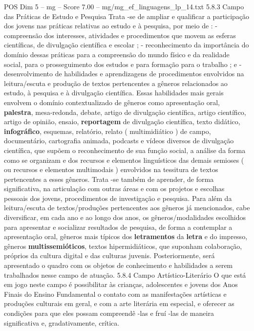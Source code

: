 \begin{textsample}{POS Dim 5 – mg – Score 7.00 – mg/mg\_ef\_linguagens\_lp\_14.txt}  \label{ex:f5_pos_188}
5.8.3 Campo das Práticas de Estudo e Pesquisa Trata -se de ampliar e qualificar a participação dos jovens nas práticas relativas ao estudo e à pesquisa, por meio de : - compreensão dos interesses, atividades e procedimentos que movem as esferas científicas, de divulgação científica e escolar ; - reconhecimento da importância do domínio dessas práticas para a compreensão do mundo físico e da realidade social, para o prosseguimento dos estudos e para formação para o trabalho ; e - desenvolvimento de habilidades e aprendizagens de procedimentos envolvidos na leitura/escuta e produção de textos pertencentes a gêneros relacionados ao estudo, à pesquisa e à divulgação científica.
Essas habilidades mais gerais envolvem o domínio contextualizado de gêneros como apresentação oral, \textbf{palestra}, mesa-redonda, debate, artigo de divulgação científica, artigo científico, artigo de opinião, ensaio, \textbf{reportagem} de divulgação científica, texto didático, \textbf{infográfico}, esquemas, relatório, relato ( multimidiático ) de campo, documentário, cartografia animada, podcasts e vídeos diversos de divulgação científica, que supõem o reconhecimento de sua função social, a análise da forma como se organizam e dos recursos e elementos linguísticos das demais semioses ( ou recursos e elementos multimodais ) envolvidos na tessitura de textos pertencentes a esses gêneros.
Trata -se também de aprender, de forma significativa, na articulação com outras áreas e com os projetos e escolhas pessoais dos jovens, procedimentos de investigação e pesquisa.
Para além da leitura/escuta de textos/produções pertencentes aos gêneros já mencionados, cabe diversificar, em cada ano e ao longo dos anos, os gêneros/modalidades escolhidos para apresentar e socializar resultados de pesquisa, de forma a contemplar a apresentação oral, gêneros mais típicos dos \textbf{letramentos} da \textbf{letra} e do impresso, gêneros \textbf{multissemióticos}, textos hipermidiáticos, que suponham colaboração, próprios da cultura digital e das culturas juvenis.
Posteriormente, será apresentado o quadro com os objetos de conhecimento e habilidades a serem trabalhados nesse campo de atuação. 5.8.4 Campo Artístico-Literário O que está em jogo neste campo é possibilitar às crianças, adolescentes e jovens dos Anos Finais do Ensino Fundamental o contato com as manifestações artísticas e produções culturais em geral, e com a arte literária em especial, e oferecer as condições para que eles possam compreendê -las e fruí -las de maneira significativa e, gradativamente, crítica.

\end{textsample}
